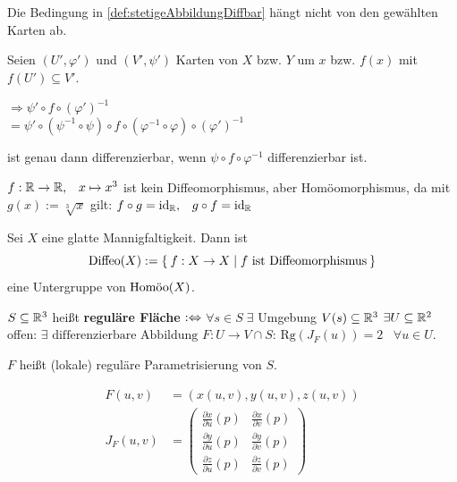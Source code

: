 \begin{bemerkung}
    Die Bedingung in \cref{def:stetigeAbbildungDiffbar} hängt nicht
    von den gewählten Karten ab.
\end{bemerkung}

\begin{beweis}
    Seien $(U', \varphi')$ und $(V', \psi')$ Karten von $X$ bzw. $Y$
    um $x$ bzw. $f(x)$ mit $f(U') \subseteq V'$.
    
    $\Rightarrow \psi' \circ f \circ (\varphi')^{-1}$\\
    $= \psi' \circ ( \psi^{-1} \circ \psi) \circ f \circ (\varphi^{-1} \circ \varphi ) \circ (\varphi')^{-1}$

    ist genau dann differenzierbar, wenn $\psi \circ f \circ \varphi^{-1}$
    differenzierbar ist.
\end{beweis}

\begin{beispiel}
    $f: \mdr \rightarrow \mdr, \;\;\; x \mapsto x^3$ ist kein
    Diffeomorphismus, aber Homöomorphismus, da mit $g(x) := \sqrt[3]{x}$
    gilt: $f \circ g = \id_\mdr, \;\;\; g \circ f = \id_\text{\mdr}$
\end{beispiel}

\begin{bemerkung}
    Sei $X$ eine glatte Mannigfaltigkeit. Dann ist
    \[\Diffeo(X) := \Set{f:X \rightarrow X | f \text{ ist Diffeomorphismus}}\]
    eine Untergruppe von $\Homoo(X)$.
\end{bemerkung}

\begin{definition}\label{def:8.5}%
    $S \subseteq \mdr^3$ heißt \textbf{reguläre Fläche} $:\gdw$
    $\forall s \in S\;\exists $ Umgebung $V(s) \subseteq \mdr^3$ $\exists U \subseteq \mdr^2$ offen: 
    $\exists \text{ differenzierbare Abbildung } F: U \rightarrow V \cap S$: 
    $\text{Rg}(J_F(u)) = 2\;\;\;\forall u \in U$.

    $F$ heißt (lokale) reguläre Parametrisierung von $S$.

    \begin{align*}
        F(u,v) &= \left (x(u,v), y(u,v), z(u,v) \right )\\
        J_F(u,v) &= \begin{pmatrix}
            \frac{\partial x}{\partial u} (p) & \frac{\partial x}{\partial v} (p)\\
            \frac{\partial y}{\partial u} (p) & \frac{\partial y}{\partial v} (p)\\
            \frac{\partial z}{\partial u} (p) & \frac{\partial z}{\partial v} (p)
        \end{pmatrix}
    \end{align*}
\end{definition}

